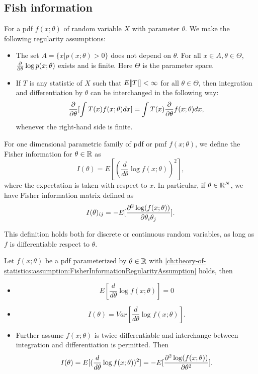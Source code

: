 \begin{refsection}
\subsection{Fish information}
\begin{assumption}\label{ch:theory-of-statistics:assumption:FisherInformationRegularityAssumption}
	For a pdf $f(x;\theta)$ of random variable $X$ with parameter $\theta$. We make the following regularity assumptions:
	\begin{itemize}
		\item The set $A = \{x|p(x;\theta) > 0\}$ does not depend on $\theta$. For all $x\in A, \theta\in \Theta$, $\frac{\partial }{\partial \theta}\log p(x;\theta)$ exists and is finite. Here $\Theta$ is the parameter space.
		\item If $T$ is any statistic of $X$ such that $E[\abs{T}] < \infty$ for all $\theta\in \Theta$, then integration and differentiation by $\theta$ can be interchanged in the following way:
		$$\frac{\partial }{\partial \theta}[\int T(x)f(x;\theta)dx] = \int T(x)\frac{\partial }{\partial \theta} f(x;\theta)dx,$$
		whenever the right-hand side is finite.
	\end{itemize}	
\end{assumption}



\begin{definition}
	For one dimensional parametric family of pdf or pmf $f(x;\theta)$, we define the Fisher information for $\theta\in \mathbb{R}$ as
	$$I(\theta) = E[(\frac{d}{d\theta}\log f(x;\theta))^2],$$
	where the expectation is taken with respect to $x$.
	In particular, if $\theta \in \mathbb{R}^N$, we have Fisher information matrix defined as
	$$I(\theta)_{ij} =-E[\frac{\partial^2 \log(f(x;\theta))}{\partial \theta_i\theta_j}].$$
\end{definition}

\begin{remark}
	This definition holds both for discrete or continuous random variables, as long as $f$  is differentiable respect to $\theta$. 
\end{remark}

\begin{theorem}\label{ch:theory-of-statistics:th:BasicPropertiesFisherInformation}
	Let $f(x;\theta)$ be a pdf parameterized by $\theta\in \mathbb{R}$ with \autoref{ch:theory-of-statistics:assumption:FisherInformationRegularityAssumption} holds, then 
	\begin{itemize}
		\item $$E[\frac{d}{d\theta} \log f(x;\theta)] = 0$$
		\item $$I(\theta) = Var[\frac{d}{d\theta} \log f(x;\theta)].$$
		\item Further assume $f(x;\theta)$ is twice differentiable and interchange between integration and differentiation is permitted. Then
		$$I(\theta) = E[(\frac{d}{d\theta}\log f(x;\theta))^2] = -E[\frac{\partial^2 \log(f(x;\theta))}{\partial \theta^2}].$$
		

\end{itemize}
\end{theorem}
\end{refsection}
